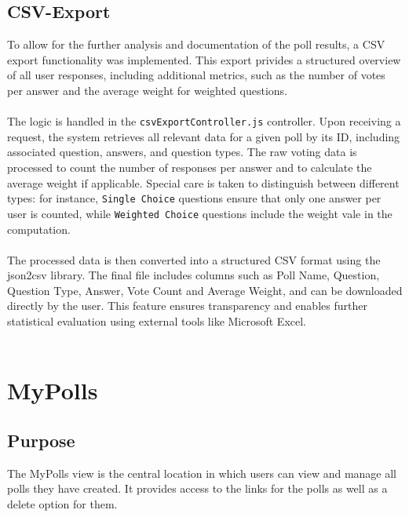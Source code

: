 \documentclass[a4paper,12pt]{report}
\begin{document}
\subsection{CSV-Export}
To allow for the further analysis and documentation of the poll results, a CSV export functionality was implemented. This export privides a structured overview of all user responses, including additional metrics, such as the number of votes per answer and the average weight for weighted questions.\\ \\
The logic is handled in the \texttt{csvExportController.js} controller. Upon receiving a request, the system retrieves all relevant data for a given poll by its ID, including associated question, answers, and question types. The raw voting data is processed to count the number of responses per answer and to calculate the average weight if applicable. Special care is taken to distinguish between different types: for instance, \texttt{Single Choice} questions ensure that only one answer per user is counted, while \texttt{Weighted Choice} questions include the weight vale in the computation.\\ \\
The processed data is then converted into a structured CSV format using the json2csv library. The final file includes columns such as Poll Name, Question, Question Type, Answer, Vote Count and Average Weight, and can be downloaded directly by the user. This feature ensures transparency and enables further statistical evaluation using external tools like Microsoft Excel. \parencite{json2csv} \\ \\

\section{MyPolls}
\subsection{Purpose}
The MyPolls view is the central location in which users can view and manage all polls they have created. It provides access to the links for the polls as well as a delete option for them. \\
\end{document}
